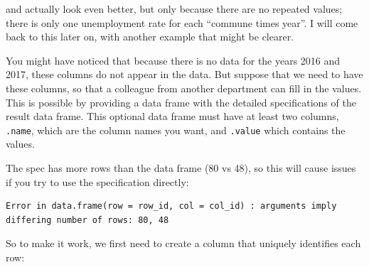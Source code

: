 \documentclass[]{gitbook}
\newenvironment{Shaded}{\begin{snugshade}}{\end{snugshade}}
\newcommand{\DataTypeTok}[1]{\textcolor[rgb]{0.13,0.29,0.53}{#1}}
\newcommand{\DecValTok}[1]{\textcolor[rgb]{0.00,0.00,0.81}{#1}}
\newcommand{\KeywordTok}[1]{\textcolor[rgb]{0.13,0.29,0.53}{\textbf{#1}}}
\newcommand{\NormalTok}[1]{#1}
\newcommand{\OperatorTok}[1]{\textcolor[rgb]{0.81,0.36,0.00}{\textbf{#1}}}
\newcommand{\OtherTok}[1]{\textcolor[rgb]{0.56,0.35,0.01}{#1}}
\newcommand{\StringTok}[1]{\textcolor[rgb]{0.31,0.60,0.02}{#1}}
\begin{document}
and actually look even better, but only because there are no repeated values; there is only one
unemployment rate for each ``commune times year''. I will come back to this later on, with another
example that might be clearer.

You might have noticed that because there is no data for
the years 2016 and 2017, these columns do not appear in the data. But suppose that we need to have
these columns, so that a colleague from another department can fill in the values. This is possible
by providing a data frame with the detailed specifications of the result data frame. This optional
data frame must have at least two columns, \texttt{.name}, which are the column names you want, and
\texttt{.value} which contains the values.

\begin{Shaded}
\end{Shaded}

The spec has more rows than the data frame (80 vs 48), so this will cause issues if you try to use
the specification directly:

\begin{Shaded}
\end{Shaded}

\begin{verbatim}
Error in data.frame(row = row_id, col = col_id) : arguments imply differing number of rows: 80, 48
\end{verbatim}

So to make it work, we first need to create a column that uniquely identifies each row:
\end{document}
